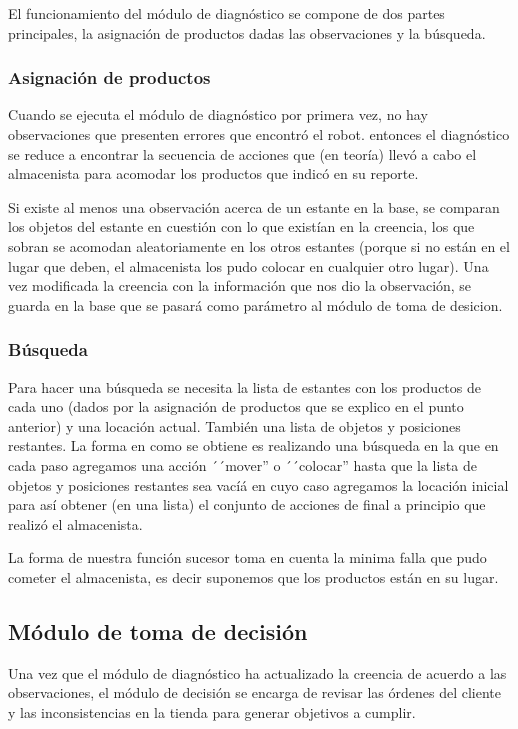 \documentclass[11pt]{article}
\begin{document}
El funcionamiento del módulo de diagnóstico se compone de dos
partes principales, la asignación de productos dadas las
observaciones y la búsqueda.

\subsubsection{Asignación de productos}

Cuando se ejecuta el módulo de diagnóstico por primera vez, no
hay observaciones que presenten errores que encontró el robot.
entonces el diagnóstico se reduce a encontrar la secuencia de
acciones que (en teoría) llevó a cabo el almacenista para
acomodar los productos que indicó en su reporte.

Si existe al menos una observación acerca de un estante en la base, se
comparan los objetos del estante en cuestión con lo que existían en la
creencia, los que sobran se acomodan aleatoriamente en los otros estantes
(porque si no están en el lugar que deben, el almacenista los pudo
colocar en cualquier otro lugar). Una vez modificada la creencia con
la información que nos dio la observación, se guarda en la base que se
pasará como parámetro al módulo de toma de desicion.


\subsubsection{Búsqueda}

Para hacer una búsqueda se necesita la lista de estantes con los
productos de cada uno (dados por la asignación de productos que se
explico en el punto anterior) y una locación actual. También una lista
de objetos y posiciones restantes.
La forma en como se obtiene es realizando una búsqueda en la que en cada
paso agregamos una acción ´´mover'' o ´´colocar'' hasta que la lista de
objetos y posiciones restantes sea vacíá en cuyo caso agregamos la
locación inicial para así obtener (en una lista) el conjunto de acciones
de final a principio que realizó el almacenista.

La forma de nuestra función sucesor toma en cuenta la minima falla que pudo
cometer el almacenista, es decir suponemos que los productos están en su
lugar.

\subsection{Módulo de toma de decisión}

Una vez que el módulo de diagnóstico ha actualizado la creencia de acuerdo a las observaciones, el módulo de decisión se encarga de revisar las órdenes del cliente y las inconsistencias en la tienda para generar objetivos a cumplir.
\end{document}
